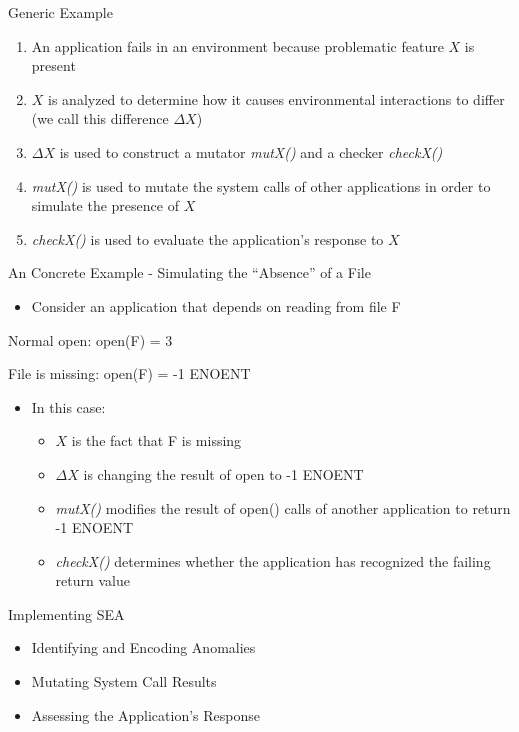 \documentclass[pdf]{beamer}
\begin{document}
\begin{frame}{Generic Example}
  \begin{enumerate}
    \item{An application fails in an environment because problematic
      feature $X$ is present}
    \item{$X$ is analyzed to determine how it causes environmental
      interactions to differ (we call this difference $\Delta X$)}
    \item{$\Delta X$ is used to construct a mutator \textit{mutX()} and
      a checker \textit{checkX()}}
    \item{\textit{mutX()} is used to mutate the system calls of other
      applications in order to simulate the presence of $X$}
    \item{\textit{checkX()} is used to evaluate the application's response
      to $X$}
  \end{enumerate}
\end{frame}


\begin{frame}{An Concrete Example - Simulating the ``Absence'' of a File}
  \begin{itemize}
    \item{Consider an application that depends on reading from file F}
  \end{itemize}

  Normal open: open(F) = 3

  File is missing: open(F) = -1 ENOENT

  \begin{itemize}
    \item{In this case:}
      \begin{itemize}
        \item{$X$ is the fact that F is missing}
        \item{$\Delta X$ is changing the result of open to -1 ENOENT}
        \item{\textit{mutX()} modifies the result of open() calls of another
          application to return -1 ENOENT}
        \item{\textit{checkX()} determines whether the application has
          recognized the failing return value}
      \end{itemize}
  \end{itemize}
\end{frame}


\begin{frame}{Implementing SEA}
  \begin{itemize}
    \item{Identifying and Encoding Anomalies}
    \item{Mutating System Call Results}
    \item{Assessing the Application's Response}
  \end{itemize}
\end{frame}
\end{document}
